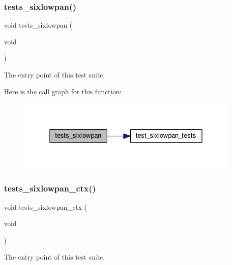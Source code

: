 \subsubsection{\texorpdfstring{tests\+\_\+sixlowpan()}{tests\_sixlowpan()}}
{\footnotesize\ttfamily void tests\+\_\+sixlowpan (\begin{DoxyParamCaption}\item[{void}]{ }\end{DoxyParamCaption})}



The entry point of this test suite. 

Here is the call graph for this function\+:
\nopagebreak
\begin{figure}[H]
\begin{center}
\leavevmode
\includegraphics[width=312pt]{group__unittests_gab1ea4d232c2abb95e5705f20432f3e07_cgraph}
\end{center}
\end{figure}
\mbox{\label{group__unittests_gaf9311b39cb1410823a35205c822900d9}} 
\subsubsection{\texorpdfstring{tests\+\_\+sixlowpan\+\_\+ctx()}{tests\_sixlowpan\_ctx()}}
{\footnotesize\ttfamily void tests\+\_\+sixlowpan\+\_\+ctx (\begin{DoxyParamCaption}\item[{void}]{ }\end{DoxyParamCaption})}



The entry point of this test suite. 

